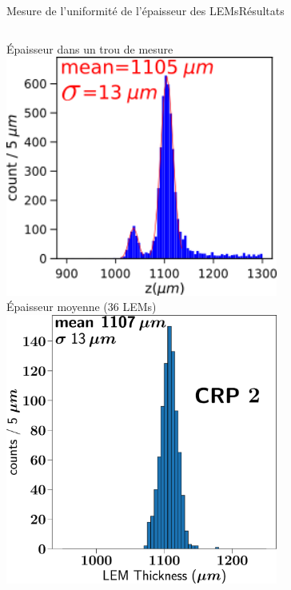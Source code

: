     \begin{frame}{Mesure de l'uniformité de l'épaisseur des LEMs}{Résultats}
    	\begin{scriptsize}
    		\begin{columns}
    			\begin{column}{0.48\textwidth}
    				\centering
    				Épaisseur dans un trou de mesure\\
    				\centering
    				\includegraphics[width=0.7\textwidth]{./pictures/distri_1_trou_lem.png}\\
    				\vspace{0.15cm}
    				\centering
    				Épaisseur moyenne (36 LEMs)\\
    				\includegraphics[width=0.7\textwidth]{./pictures/LEM_sum_all_histo_CERN.pdf}
    			\end{column}
    			\hfill
    			\begin{column}{0.48\textwidth}

\end{column}
\end{columns}
\end{scriptsize}
\end{frame}
